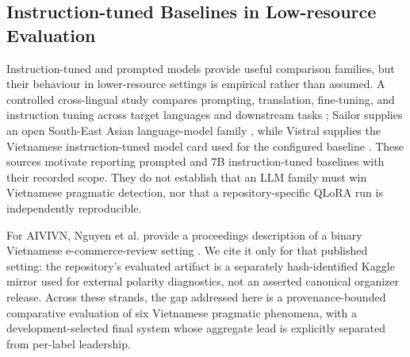 \subsection{Instruction-tuned Baselines in Low-resource Evaluation}

Instruction-tuned and prompted models provide useful comparison families, but their behaviour in lower-resource settings is empirical rather than assumed. A controlled cross-lingual study compares prompting, translation, fine-tuning, and instruction tuning across target languages and downstream tasks \citep{toukmaji-flanigan-2025-adapting}; Sailor supplies an open South-East Asian language-model family \citep{dou-etal-2024-sailor}, while Vistral supplies the Vietnamese instruction-tuned model card used for the configured baseline \citep{nguyen-etal-2023-vistral}. These sources motivate reporting prompted and 7B instruction-tuned baselines with their recorded scope. They do not establish that an LLM family must win Vietnamese pragmatic detection, nor that a repository-specific QLoRA run is independently reproducible.

For AIVIVN, Nguyen et al. provide a proceedings description of a binary Vietnamese e-commerce-review setting \citep{nguyen-etal-2020-efficient}. We cite it only for that published setting: the repository's evaluated artifact is a separately hash-identified Kaggle mirror used for external polarity diagnostics, not an asserted canonical organizer release. Across these strands, the gap addressed here is a provenance-bounded comparative evaluation of six Vietnamese pragmatic phenomena, with a development-selected final system whose aggregate lead is explicitly separated from per-label leadership.

